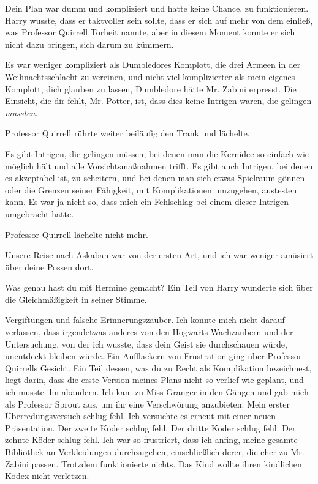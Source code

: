 \glqq{}Dein Plan war dumm und kompliziert und hatte keine Chance, zu
funktionieren.\grqq{} Harry wusste, dass er taktvoller sein sollte, dass er sich auf
mehr von dem einließ, was Professor Quirrell Torheit nannte, aber in diesem
Moment konnte er sich nicht dazu bringen, sich darum zu kümmern.

\glqq{}Es war weniger kompliziert als Dumbledores Komplott, die drei Armeen in
der Weihnachtsschlacht zu vereinen, und nicht viel komplizierter als mein
eigenes Komplott, dich glauben zu lassen, Dumbledore hätte Mr. Zabini erpresst.
Die Einsicht, die dir fehlt, Mr. Potter, ist, dass dies keine Intrigen waren,
die gelingen \emph{mussten}.\grqq{}

Professor Quirrell rührte weiter beiläufig den Trank und lächelte.

\glqq{}Es gibt Intrigen, die gelingen müssen, bei denen man die Kernidee so
einfach wie möglich hält und alle Vorsichtsmaßnahmen trifft. Es gibt auch
Intrigen, bei denen es akzeptabel ist, zu scheitern, und bei denen man sich
etwas Spielraum gönnen oder die Grenzen seiner Fähigkeit, mit Komplikationen
umzugehen, austesten kann. Es war ja nicht so, dass mich ein Fehlschlag bei
einem dieser Intrigen umgebracht hätte.\grqq{}

Professor Quirrell lächelte nicht mehr.

\glqq{}Unsere Reise nach Askaban war von der ersten Art, und ich war weniger
amüsiert über deine Possen dort.\grqq{}

\glqq{}Was genau hast du mit Hermine gemacht?\grqq{} Ein Teil von Harry wunderte sich
über die Gleichmäßigkeit in seiner Stimme.

\glqq{}Vergiftungen und falsche Erinnerungszauber. Ich konnte mich nicht darauf
verlassen, dass irgendetwas anderes von den Hogwarts-Wachzaubern und der
Untersuchung, von der ich wusste, dass dein Geist sie durchschauen würde,
unentdeckt bleiben würde.\grqq{} Ein Aufflackern von Frustration ging über Professor
Quirrells Gesicht. \glqq{}Ein Teil dessen, was du zu Recht als Komplikation
bezeichnest, liegt darin, dass die erste Version meines Plans nicht so verlief
wie geplant, und ich musste ihn abändern. Ich kam zu Miss Granger in den Gängen
und gab mich als Professor Sprout aus, um ihr eine Verschwörung anzubieten. Mein
erster Überredungsversuch schlug fehl. Ich versuchte es erneut mit einer neuen
Präsentation. Der zweite Köder schlug fehl. Der dritte Köder schlug fehl. Der
zehnte Köder schlug fehl. Ich war so frustriert, dass ich anfing, meine gesamte
Bibliothek an Verkleidungen durchzugehen, einschließlich derer, die eher zu Mr.
Zabini passen. Trotzdem funktionierte nichts. Das Kind wollte ihren kindlichen
Kodex nicht verletzen.\grqq{}

